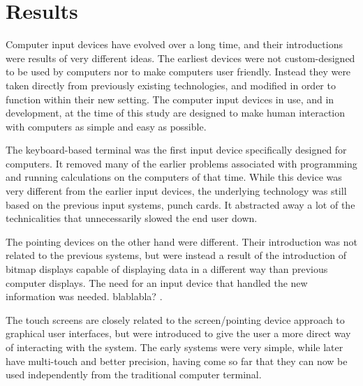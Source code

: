 
\section{Results}


Computer input devices have evolved over a long time, and their introductions were results of very different ideas. The earliest devices were not custom-designed to be used by computers nor to make computers user friendly. Instead they were taken directly from previously existing technologies, and modified in order to function within their new setting. The computer input devices in use, and in development, at the time of this study are designed to make human interaction with computers as simple and easy as possible.

The keyboard-based terminal was the first input device specifically designed for computers. It removed many of the earlier problems associated with programming and running calculations on the computers of that time. While this device was very different from the earlier input devices, the underlying technology was still based on the previous input systems, punch cards. It abstracted away a lot of the technicalities that unnecessarily slowed the end user down.

The pointing devices on the other hand were different. Their introduction was not related to the previous systems, but were instead a result of the introduction of bitmap displays capable of displaying data in a different way than previous computer displays. The need for an input device that handled the new information was needed. blablabla? .

The touch screens are closely related to the screen/pointing device approach to graphical user interfaces, but were introduced to give the user a more direct way of interacting with the system. The early systems were very simple, while later have multi-touch and better precision, having come so far that they can now be used independently from the traditional computer terminal. 


